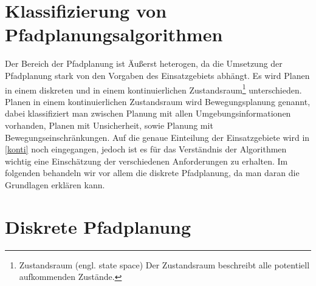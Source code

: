 \section{Klassifizierung von Pfadplanungsalgorithmen} \label{Kapitel 4.2} %
Der Bereich der Pfadplanung ist Äußerst heterogen, da die Umsetzung der Pfadplanung stark von den Vorgaben des Einsatzgebiets abhängt. 
Es wird Planen in einem diskreten und in einem kontinuierlichen Zustandsraum\footnote{Zustandsraum (engl. state space) Der Zustandsraum beschreibt alle potentiell aufkommenden Zustände.} unterschieden. Planen in einem kontinuierlichen Zustandsraum wird Bewegungsplanung genannt, dabei klassifiziert man zwischen Planung mit allen Umgebungsinformationen vorhanden, Planen mit Unsicherheit, sowie Planung mit Bewegungseinschränkungen.
Auf die genaue Einteilung der Einsatzgebiete wird in \ref{konti} noch eingegangen, jedoch ist es für das Verständnis der Algorithmen wichtig eine Einschätzung der verschiedenen Anforderungen zu erhalten. Im folgenden behandeln wir vor allem die diskrete Pfadplanung, da man daran die Grundlagen erklären kann. \cite[~S. 24ff]{Lav06} 

\section{Diskrete Pfadplanung} \label{Kapitel 4.3} %

